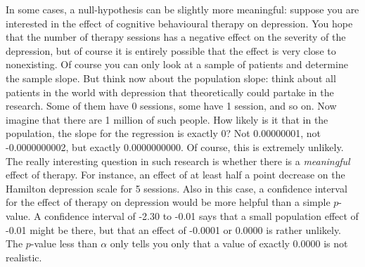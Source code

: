 \documentclass[]{report}\usepackage[]{graphicx}\usepackage[]{color}
\begin{document}
In some cases, a null-hypothesis can be slightly more meaningful: suppose you are interested in the effect of cognitive behavioural therapy on depression. You hope that the number of therapy sessions has a negative effect on the severity of the depression, but of course it is entirely possible that the effect is very close to nonexisting. Of course you can only look at a sample of patients and determine the sample slope. But think now about the population slope: think about all patients in the world with depression that theoretically could partake in the research. Some of them have 0 sessions, some have 1 session, and so on. Now imagine that there are 1 million of such people. How likely is it that in the population, the slope for the regression is exactly 0? Not 0.00000001, not -0.0000000002, but exactly 0.0000000000. Of course, this is extremely unlikely. The really interesting question in such research is whether there is a \textit{meaningful} effect of therapy. For instance, an effect of at least half a point decrease on the Hamilton depression scale for 5 sessions. Also in this case, a confidence interval for the effect of therapy on depression would be more helpful than a simple $p$-value. A confidence interval of -2.30 to -0.01 says that a small population effect of -0.01 might be there, but that an effect of -0.0001 or 0.0000 is rather unlikely. The $p$-value less than $\alpha$ only tells you only that a value of exactly 0.0000 is not realistic.
\end{document}
